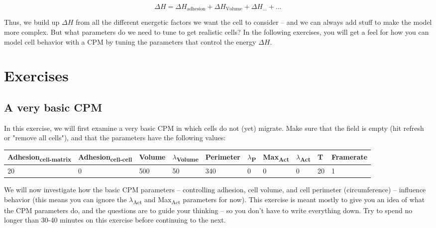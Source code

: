 \documentclass{article}
\begin{document}
\begin{equation}
	\Delta H = \Delta H_\text{adhesion} + \Delta H_\text{Volume} + \Delta H_\text{...}  + ...
\end{equation}

Thus, we build up $\Delta H$ from all the different energetic factors we want the cell to consider -- and we can always add stuff to make the model more complex. But what parameters do we need to tune to get realistic cells? In the following exercises, you will get a feel for how you can model cell behavior with a CPM by tuning the parameters that control the energy $\Delta H$. 

\section*{Exercises} 

\subsection*{A very basic CPM}

In this exercise, we will first examine a very basic CPM in which cells do not (yet) migrate.
Make sure that the field is empty (hit refresh or "remove all cells"), and that the parameters
have the following values:

\begin{center}
\setlength{\tabcolsep}{3pt}
\small
	\begin{tabular}{l l l l l l l l l l }
		Adhesion\textsubscript{cell-matrix} & Adhesion\textsubscript{cell-cell} &
			Volume & $\lambda$\textsubscript{Volume} & 
			Perimeter & $\lambda$\textsubscript{P} &
			Max\textsubscript{Act} & $\lambda$\textsubscript{Act} &
			T & Framerate \\ \hline
		20 & 0 & 500 & 50 & 340 & 0 & 0 & 0 & 20 & 1 \\
	\end{tabular}

\end{center}

We will now investigate how the basic CPM parameters -- controlling adhesion, cell volume, and cell perimeter (circumference) -- influence behavior (this means you can ignore the $\lambda$\textsubscript{Act} and Max\textsubscript{Act} parameters for now). This exercise is meant mostly to give you an idea of what the CPM parameters do, and the questions are to guide your thinking -- so you don't have to write everything down. Try to spend no longer than 30-40 minutes on this exercise before continuing to the next.
\end{document}
